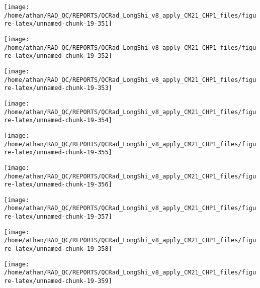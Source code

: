 \documentclass[
  10pt,
  a4paper,oneside]{article}
\begin{document}
\begin{center}\texttt{[image: /home/athan/RAD\_QC/REPORTS/QCRad\_LongShi\_v8\_apply\_CM21\_CHP1\_files/figure-latex/unnamed-chunk-19-351]} \end{center}

\begin{center}\texttt{[image: /home/athan/RAD\_QC/REPORTS/QCRad\_LongShi\_v8\_apply\_CM21\_CHP1\_files/figure-latex/unnamed-chunk-19-352]} \end{center}

\begin{center}\texttt{[image: /home/athan/RAD\_QC/REPORTS/QCRad\_LongShi\_v8\_apply\_CM21\_CHP1\_files/figure-latex/unnamed-chunk-19-353]} \end{center}

\begin{center}\texttt{[image: /home/athan/RAD\_QC/REPORTS/QCRad\_LongShi\_v8\_apply\_CM21\_CHP1\_files/figure-latex/unnamed-chunk-19-354]} \end{center}

\begin{center}\texttt{[image: /home/athan/RAD\_QC/REPORTS/QCRad\_LongShi\_v8\_apply\_CM21\_CHP1\_files/figure-latex/unnamed-chunk-19-355]} \end{center}

\begin{center}\texttt{[image: /home/athan/RAD\_QC/REPORTS/QCRad\_LongShi\_v8\_apply\_CM21\_CHP1\_files/figure-latex/unnamed-chunk-19-356]} \end{center}

\begin{center}\texttt{[image: /home/athan/RAD\_QC/REPORTS/QCRad\_LongShi\_v8\_apply\_CM21\_CHP1\_files/figure-latex/unnamed-chunk-19-357]} \end{center}

\begin{center}\texttt{[image: /home/athan/RAD\_QC/REPORTS/QCRad\_LongShi\_v8\_apply\_CM21\_CHP1\_files/figure-latex/unnamed-chunk-19-358]} \end{center}

\begin{center}\texttt{[image: /home/athan/RAD\_QC/REPORTS/QCRad\_LongShi\_v8\_apply\_CM21\_CHP1\_files/figure-latex/unnamed-chunk-19-359]} \end{center}
\end{document}
